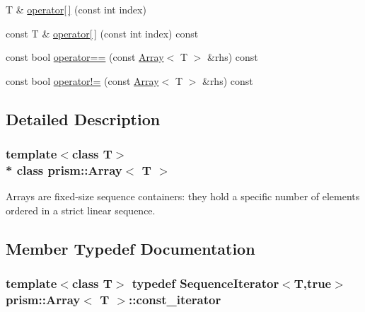 \begin{DoxyCompactItemize}
\item 
T \& \hyperlink{classprism_1_1_array_a5c12bfbaf8dd10fee4124d7a9d8683bb}{operator\mbox{[}$\,$\mbox{]}} (const int index)
\item 
const T \& \hyperlink{classprism_1_1_array_a30e0857225e5ee2712c4edca0e7462bf}{operator\mbox{[}$\,$\mbox{]}} (const int index) const 
\item 
const bool \hyperlink{classprism_1_1_array_a17fded803080c4eed55773ad07ed8740}{operator==} (const \hyperlink{classprism_1_1_array}{Array}$<$ T $>$ \&rhs) const 
\item 
const bool \hyperlink{classprism_1_1_array_a8ec48eaa032005ff6141481ac18e6e9f}{operator!=} (const \hyperlink{classprism_1_1_array}{Array}$<$ T $>$ \&rhs) const 
\end{DoxyCompactItemize}


\subsection{Detailed Description}
\subsubsection*{template$<$class T$>$\\*
class prism\+::\+Array$<$ T $>$}

Arrays are fixed-\/size sequence containers\+: they hold a specific number of elements ordered in a strict linear sequence. 

\subsection{Member Typedef Documentation}
\subsubsection[{\texorpdfstring{const\+\_\+iterator}{const_iterator}}]{\setlength{\rightskip}{0pt plus 5cm}template$<$class T$>$ typedef {\bf Sequence\+Iterator}$<$T,true$>$ {\bf prism\+::\+Array}$<$ T $>$\+::{\bf const\+\_\+iterator}}\hypertarget{classprism_1_1_array_a1654729fe986281be9c0064999caf3d7}{}\label{classprism_1_1_array_a1654729fe986281be9c0064999caf3d7}
